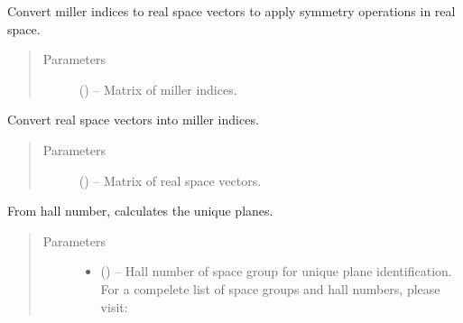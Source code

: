 \documentclass[letterpaper,10pt,english,openany,oneside]{sphinxmanual}
\begin{document}
\begin{fulllineitems}
\begin{fulllineitems}
\label{\detokenize{index:ogre.utils.UniquePlanes.miller_to_real}}
Convert miller indices to real space vectors to apply symmetry
operations in real space.
\begin{quote}\begin{description}
\item[{Parameters}] \leavevmode
{} () -- Matrix of miller indices.

\end{description}\end{quote}

\end{fulllineitems}


\begin{fulllineitems}
\label{\detokenize{index:ogre.utils.UniquePlanes.real_to_miller}}
Convert real space vectors into miller indices.
\begin{quote}\begin{description}
\item[{Parameters}] \leavevmode
{} () -- Matrix of real space vectors.

\end{description}\end{quote}

\end{fulllineitems}


\begin{fulllineitems}
\label{\detokenize{index:ogre.utils.UniquePlanes.find_unique_planes}}
From hall number, calculates the unique planes.
\begin{quote}\begin{description}
\item[{Parameters}] \leavevmode\begin{itemize}
\item {} 
 () -- Hall number of space group for unique plane identification.
For a compelete list of space groups and hall numbers, please visit:


\end{itemize}
\end{description}
\end{quote}
\end{fulllineitems}
\end{fulllineitems}
\end{document}
